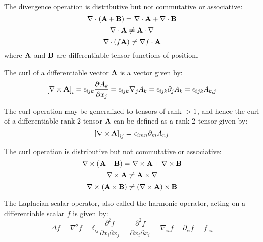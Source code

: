  The divergence operation is distributive but not commutative
or associative:
\begin{equation}
\nabla\cdot\left(\mathbf{ A}+\mathbf{ B}\right)=\nabla\cdot\mathbf{ A}
+\nabla\cdot\mathbf{ B}
\end{equation}
\begin{equation}
\nabla\cdot\mathbf{ A}\ne\mathbf{ A}\cdot\nabla
\end{equation}
\begin{equation}
\nabla\cdot\left(f\mathbf{ A}\right)\ne\nabla f\cdot\mathbf{ A}
\end{equation}
where $\mathbf{ A}$ and $\mathbf{ B}$ are differentiable tensor functions
of position.

 The curl of a differentiable vector $\mathbf{ A}$ is a
vector given by:
\begin{equation}
\left[\nabla\times\mathbf{ A}\right]_{i}=\epsilon_{ijk}\dfrac{\partial 
A_{k}}{\partial 
x_{j}}=\epsilon_{ijk}\nabla_{j}A_{k}=\epsilon_{ijk}\partial_{j}A_{k}=\epsilon_{
ijk}A_{k,j}\label{EqCurl}
\end{equation}


 The curl operation may be generalized to tensors of rank
$>1$, and hence the curl of a differentiable rank-2 tensor $\mathbf{ A}$
can be defined as a rank-2 tensor given by:
\begin{equation}
\left[\nabla\times\mathbf{ A}\right]_{ij}=\epsilon_{imn}\partial_{m}A_{nj}
\end{equation}


 The curl operation is distributive but not commutative
or associative:
\begin{equation}
\nabla\times\left(\mathbf{ A}+\mathbf{ B}\right)=\nabla\times\mathbf{ A}
+\nabla\times\mathbf{ B}
\end{equation}
\begin{equation}
\nabla\times\mathbf{ A}\ne\mathbf{ A}\times\nabla
\end{equation}
\begin{equation}
\nabla\times\left(\mathbf{ A\times 
B}\right)\ne\left(\nabla\times\mathbf{ A}\right)\times\mathbf{ B}
\end{equation}


 The Laplacian scalar operator, also called the harmonic
operator, acting on a differentiable scalar $f$ is given by:
\begin{equation}
\Delta f=\nabla^{2}f=\delta_{ij}\dfrac{\partial^{2}f}{\partial x_{i}\partial 
x_{j}}=\dfrac{\partial^{2}f}{\partial x_{i}\partial 
x_{i}}=\nabla_{ii}f=\partial_{ii}f=f_{,ii}\label{eqLaplacian}
\end{equation}


